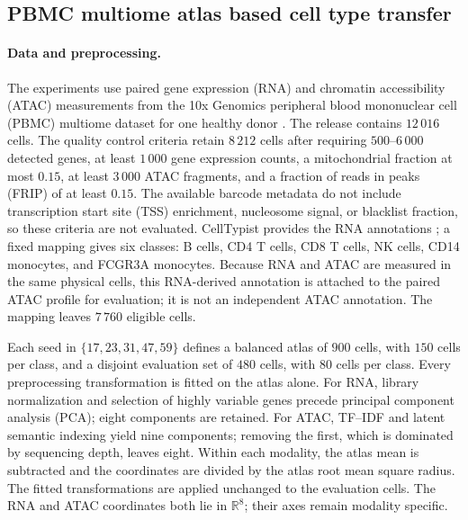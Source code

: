 \documentclass[11pt]{article}
\newcommand{\R}{\mathbb R}
\theoremstyle{plain}
\theoremstyle{definition}
\theoremstyle{remark}
\begin{document}
\subsection{PBMC multiome atlas based cell type transfer}\label{subsec:pbmc-multiome}

\paragraph{Data and preprocessing.}
The experiments use paired gene expression (RNA) and chromatin accessibility (ATAC)
measurements from the 10x Genomics peripheral blood mononuclear cell (PBMC)
multiome dataset for one healthy donor
\cite{TenXPBMC}. The release contains \(12\,016\) cells. The quality control
criteria retain \(8\,212\) cells after requiring
\(500\)--\(6\,000\) detected genes, at least \(1\,000\) gene
expression counts, a mitochondrial fraction at most \(0.15\), at least \(3\,000\)
ATAC fragments, and a fraction of reads in peaks (FRIP) of at least \(0.15\).
The available barcode metadata do not include transcription start site (TSS)
enrichment, nucleosome signal, or blacklist fraction, so these criteria are not
evaluated. CellTypist provides the RNA
annotations \cite{DominguezCondeEtAl2022}; a fixed mapping gives six classes:
B cells, CD4 T cells, CD8 T cells, NK cells, CD14 monocytes, and FCGR3A
monocytes. Because RNA and ATAC are measured in the same physical cells, this
RNA-derived annotation is attached to the paired ATAC profile for evaluation; it
is not an independent ATAC annotation. The mapping leaves \(7\,760\) eligible
cells.

Each seed in \(\{17,23,31,47,59\}\) defines a balanced atlas of \(900\)
cells, with \(150\) cells per class, and a disjoint evaluation set of \(480\)
cells, with \(80\) cells per class. Every preprocessing transformation is fitted
on the atlas alone. For RNA, library normalization and selection of highly
variable genes precede principal component analysis (PCA); eight components are
retained. For ATAC,
TF--IDF and latent semantic indexing yield nine components; removing the first,
which is dominated by sequencing depth, leaves eight. Within each modality, the
atlas mean is subtracted and the coordinates are divided by the atlas root mean
square radius. The fitted transformations are applied unchanged to the evaluation
cells. The RNA and ATAC
coordinates both lie in \(\R^8\); their axes remain modality specific.
\end{document}
